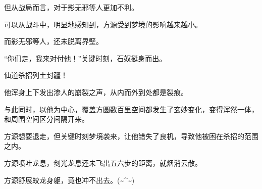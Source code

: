 \begin{this_body}
但从战局而言，对于影无邪等人更加不利。

可以从战斗中，明显地感知到，方源受到梦境的影响越来越小。

而影无邪等人，还未脱离界壁。

“你们走，我来对付他！”关键时刻，石奴挺身而出。

仙道杀招列土封疆！

他浑身上下发出渗人的崩裂之声，从内而外到处都是裂痕。

与此同时，以他为中心，覆盖方圆数百里空间都发生了玄妙变化，变得浑然一体，和周围空间区分间隔开来。

方源想要退走，但关键时刻梦境袭来，让他错失了良机，导致他被困在杀招的范围之内。

方源喷吐龙息，剑光龙息还未飞出五六步的距离，就烟消云散。

方源舒展蛟龙身躯，竟也冲不出去。(\~{}\^{}\~{})

\end{this_body}

